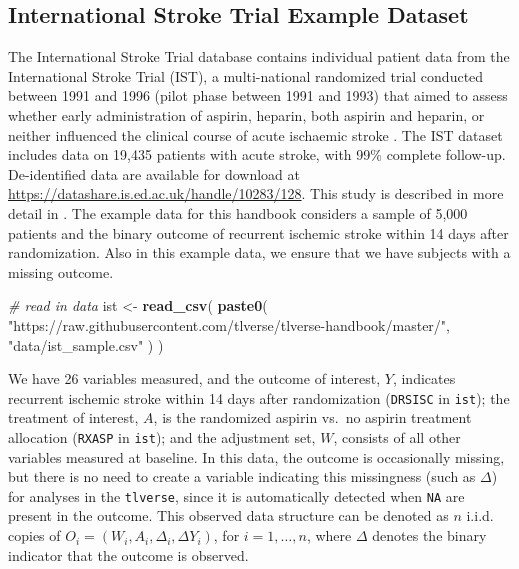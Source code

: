 \documentclass[12pt, krantz2,]{krantz}
\newenvironment{Shaded}{\begin{snugshade}}{\end{snugshade}}
\newcommand{\CommentTok}[1]{\textcolor[rgb]{0.37,0.37,0.37}{\textit{#1}}}
\newcommand{\KeywordTok}[1]{\textcolor[rgb]{0.27,0.27,0.27}{\textbf{#1}}}
\newcommand{\NormalTok}[1]{#1}
\newcommand{\StringTok}[1]{\textcolor[rgb]{0.5,0.5,0.5}{#1}}
\theoremstyle{definition}
\theoremstyle{definition}
\theoremstyle{definition}
\newcommand{\1}{\mathbbm{1}}
\begin{document}
\hypertarget{ist}{%
\subsection{International Stroke Trial Example Dataset}\label{ist}}

The International Stroke Trial database contains individual patient data from
the International Stroke Trial (IST), a multi-national randomized trial
conducted between 1991 and 1996 (pilot phase between 1991 and 1993) that aimed
to assess whether early administration of aspirin, heparin, both aspirin and
heparin, or neither influenced the clinical course of acute ischaemic stroke
\citep{sandercock1997international}. The IST dataset includes data on 19,435 patients
with acute stroke, with 99\% complete follow-up. De-identified data are
available for download at \url{https://datashare.is.ed.ac.uk/handle/10283/128}. This
study is described in more detail in \citet{sandercock2011international}. The example
data for this handbook considers a sample of 5,000 patients and the binary
outcome of recurrent ischemic stroke within 14 days after randomization. Also
in this example data, we ensure that we have subjects with a missing outcome.

\begin{Shaded}
\begin{Highlighting}[]
\CommentTok{# read in data}
\NormalTok{ist <-}\StringTok{ }\KeywordTok{read_csv}\NormalTok{(}
  \KeywordTok{paste0}\NormalTok{(}
    \StringTok{"https://raw.githubusercontent.com/tlverse/tlverse-handbook/master/"}\NormalTok{,}
    \StringTok{"data/ist_sample.csv"}
\NormalTok{  )}
\NormalTok{)}
\end{Highlighting}
\end{Shaded}

We have 26 variables measured, and the outcome of interest, \(Y\),
indicates recurrent ischemic stroke within 14 days after randomization (\texttt{DRSISC}
in \texttt{ist}); the treatment of interest, \(A\), is the randomized aspirin vs.~no
aspirin treatment allocation (\texttt{RXASP} in \texttt{ist}); and the adjustment set, \(W\),
consists of all other variables measured at baseline. In this data, the outcome
is occasionally missing, but there is no need to create a variable indicating
this missingness (such as \(\Delta\)) for analyses in the \texttt{tlverse}, since it is
automatically detected when \texttt{NA} are present in the outcome. This observed data
structure can be denoted as \(n\) i.i.d. copies of \(O_i = (W_i, A_i, \Delta_i, \Delta Y_i)\), for \(i = 1, \ldots, n\), where \(\Delta\) denotes the binary
indicator that the outcome is observed.
\end{document}
